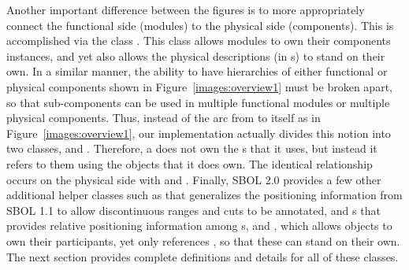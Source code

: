 Another important difference between the figures is to more appropriately connect the functional side (modules) to the physical side (components). This is accomplished via the class . This class allows modules to own their components instances, and yet also allows the physical descriptions (in s) to stand on their own. In a similar manner, the ability to have hierarchies of either functional or physical components shown in Figure~\ref{images:overview1} must be broken apart, so that sub-components can be used in multiple functional modules or multiple physical components. Thus, instead of the arc from  to itself as in Figure~\ref{images:overview1}, our implementation actually divides this notion into two classes,  and . Therefore, a  does not own the s that it uses, but instead it refers to them using the  objects that it does own.  The identical relationship occurs on the physical side with  and . Finally, SBOL 2.0 provides a few other additional helper classes such as  that generalizes the positioning information from SBOL 1.1 to allow discontinuous ranges and cuts to be annotated, and s that provides relative positioning information among s, and 
, which allows  objects to own their participants, yet only references , so that these can stand on their own. The next section provides complete definitions and details for all of these classes.
